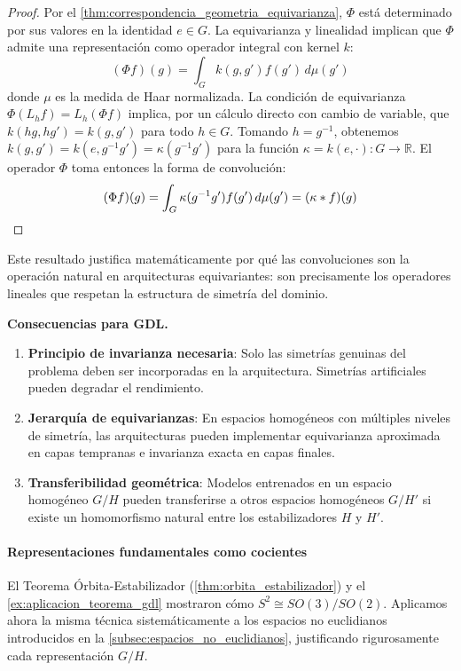 \begin{proof}
Por el \autoref{thm:correspondencia_geometria_equivarianza}, $\Phi$ está determinado por sus valores en la identidad $e \in G$. La equivarianza y linealidad implican que $\Phi$ admite una representación como operador integral con kernel $k$:
\[
(\Phi f)(g) = \int_{G} k(g, g') f(g')\, d\mu(g')
\]
donde $\mu$ es la medida de Haar normalizada. La condición de equivarianza $\Phi(L_h f) = L_h(\Phi f)$ implica, por un cálculo directo con cambio de variable, que $k(hg, hg') = k(g, g')$ para todo $h \in G$. Tomando $h = g^{-1}$, obtenemos $k(g, g') = k(e, g^{-1}g') = \kappa(g^{-1}g')$ para la función $\kappa = k(e, \cdot): G \to \mathbb{R}$. El operador $\Phi$ toma entonces la forma de convolución:
\[
(\Phi f)(g) = \int_{G} \kappa(g^{-1}g') f(g')\, d\mu(g') = (\kappa * f)(g) \qedhere
\]
\end{proof}

Este resultado justifica matemáticamente por qué las convoluciones son la operación natural en arquitecturas equivariantes: son precisamente los operadores lineales que respetan la estructura de simetría del dominio.

\textbf{Consecuencias para \gls{GDL}.}
\begin{enumerate}
    \item \textbf{Principio de invarianza necesaria}: Solo las simetrías genuinas del problema deben ser incorporadas en la arquitectura. Simetrías artificiales pueden degradar el rendimiento.

    \item \textbf{Jerarquía de equivarianzas}: En espacios homogéneos con múltiples niveles de simetría, las arquitecturas pueden implementar equivarianza aproximada en capas tempranas e invarianza exacta en capas finales.

    \item \textbf{Transferibilidad geométrica}: Modelos entrenados en un espacio homogéneo $G/H$ pueden transferirse a otros espacios homogéneos $G/H'$ si existe un homomorfismo natural entre los estabilizadores $H$ y $H'$.
\end{enumerate}

\paragraph{Representaciones fundamentales como cocientes}

El Teorema Órbita-Estabilizador (\ref{thm:orbita_estabilizador}) y el \autoref{ex:aplicacion_teorema_gdl} mostraron cómo $S^2 \cong SO(3)/SO(2)$. Aplicamos ahora la misma técnica sistemáticamente a los espacios no euclidianos introducidos en la \autoref{subsec:espacios_no_euclidianos}, justificando rigurosamente cada representación $G/H$.

